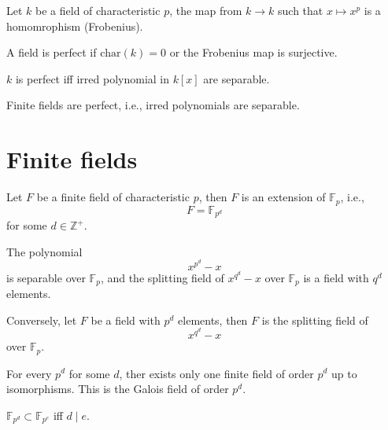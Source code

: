 \documentclass[openany]{book}
\newcommand{\Z}{\mathbb{Z}}
\newcommand{\F}{\mathbb{F}}
\begin{document}
\begin{defn}
    Let $k$ be a field of characteristic $p$, the map from $k\to k$ such that $x\mapsto x^p$ is a homomrophism (Frobenius).

    A field is perfect if $\text{char}(k)=0$ or the Frobenius map is surjective.
\end{defn}

\begin{prop}
    $k$ is perfect iff irred polynomial in $k[x]$ are separable.
\end{prop}

\begin{cor}
    Finite fields are perfect, i.e., irred polynomials are separable.
\end{cor}


\section{Finite fields}
\begin{defn}
    Let $F$ be a finite field of characteristic $p$, then $F$ is an extension of $\F_{p}$, i.e., 
    \begin{equation*}
        F=\F_{p^d}
    \end{equation*}
    for some $d\in\Z^+$.
\end{defn}

\begin{thm}
    The polynomial
    \begin{equation*}
        x^{p^d}-x
    \end{equation*}
    is separable over $\F_p$, and the splitting field of $x^{q^d}-x$ over $\F_p$ is a field with $q^d$ elements. 

    Conversely, let $F$ be a field with $p^d$ elements, then $F$ is the splitting field of 
    \begin{equation*}
        x^{q^d}-x
    \end{equation*}
    over $\F_p$.
\end{thm}


\begin{cor}
    For every $p^d$ for some $d$, ther exists only one finite field of order $p^d$ up to isomorphisms. This is the Galois field of order $p^d$.
\end{cor}



\begin{cor}
    $\F_{p^d}\subset\F_{p^e}$ iff $d\mid e$.
\end{cor}
\end{document}
